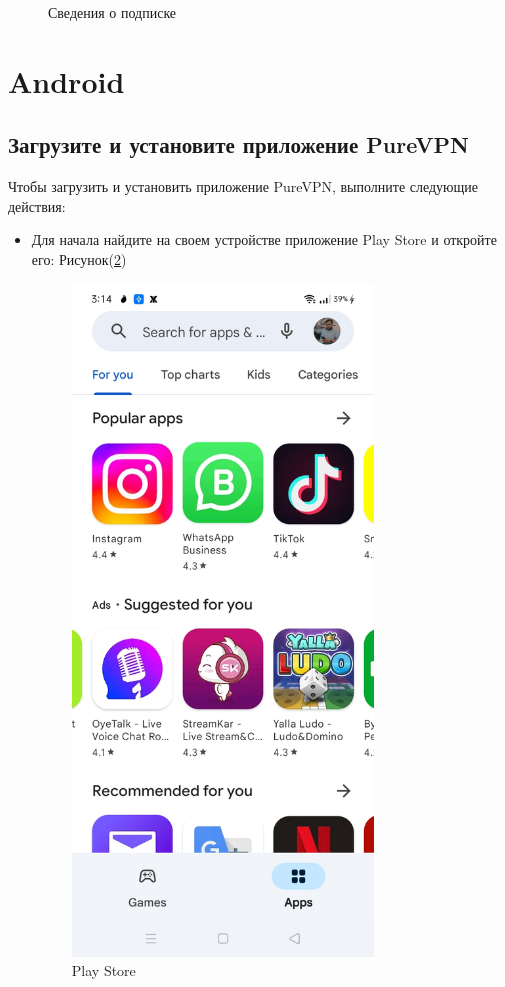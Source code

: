 \begin{itemize}
\begin{figure}[H]
\centering
\caption{Сведения о подписке}
\label{fig:38}
\end{figure}
\end{itemize}

\section{Android}

\subsection{Загрузите и установите приложение PureVPN} 
Чтобы загрузить и установить приложение PureVPN, выполните следующие действия:
\begin{itemize}
\item Для начала найдите на своем устройстве приложение Play Store и откройте его:  Рисунок(\ref{fig:39})
\begin{figure}[H]
\includegraphics[width=8cm]{30.png}
\centering
\caption{Play Store}
\label{fig:39}
\end{figure}


\end{itemize}
